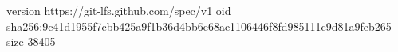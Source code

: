 version https://git-lfs.github.com/spec/v1
oid sha256:9c41d1955f7cbb425a9f1b36d4bb6e68ae1106446f8fd985111c9d81a9feb265
size 38405
